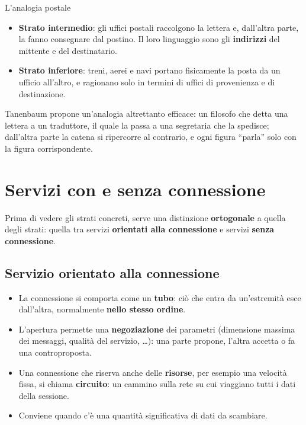 \begin{esempio}{L'analogia postale}
\begin{itemize}
          infilare la lettera e una da cui ritirarla. I loro ``protocolli'' sono scrivere e leggere una lettera.
    \item \textbf{Strato intermedio}: gli uffici postali raccolgono la lettera e, dall'altra parte, la fanno
          consegnare dal postino. Il loro linguaggio sono gli \textbf{indirizzi} del mittente e del destinatario.
    \item \textbf{Strato inferiore}: treni, aerei e navi portano fisicamente la posta da un ufficio all'altro, e
          ragionano solo in termini di uffici di provenienza e di destinazione.
\end{itemize}
Tanenbaum propone un'analogia altrettanto efficace: un filosofo che detta una lettera a un traduttore, il
quale la passa a una segretaria che la spedisce; dall'altra parte la catena si ripercorre al contrario, e ogni
figura ``parla'' solo con la figura corrispondente.
\end{esempio}

\section{Servizi con e senza connessione}

Prima di vedere gli strati concreti, serve una distinzione \textbf{ortogonale} a quella degli strati:
quella tra servizi \textbf{orientati alla connessione} e servizi \textbf{senza connessione}.

\subsection{Servizio orientato alla connessione}


\begin{itemize}
    \item La connessione si comporta come un \textbf{tubo}: ciò che entra da un'estremità esce
          dall'altra, normalmente \textbf{nello stesso ordine}.
    \item L'apertura permette una \textbf{negoziazione} dei parametri (dimensione massima dei messaggi,
          qualità del servizio, \dots): una parte propone, l'altra accetta o fa una controproposta.
    \item Una connessione che riserva anche delle \textbf{risorse}, per esempio una velocità fissa, si
          chiama \textbf{circuito}: un cammino sulla rete su cui viaggiano tutti i dati della sessione.
    \item Conviene quando c'è una quantità significativa di dati da scambiare.
\end{itemize}

